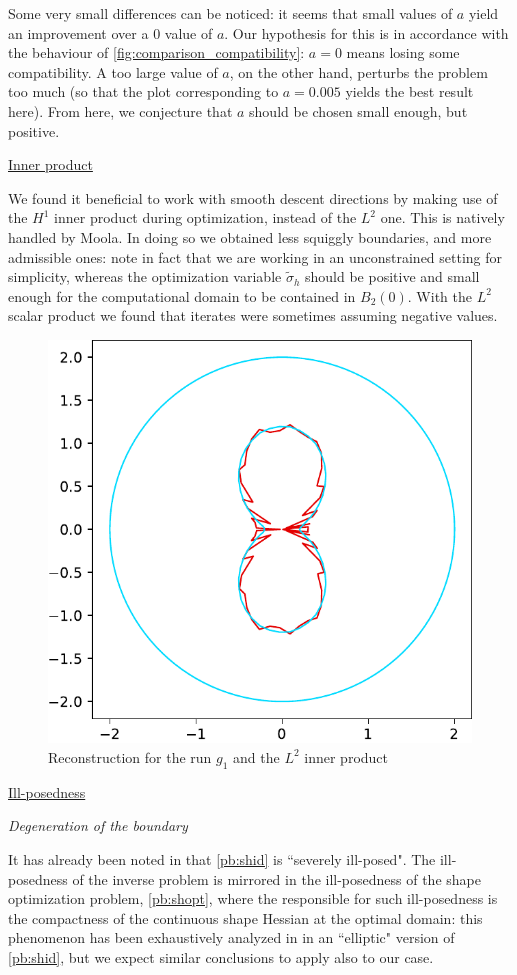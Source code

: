 \documentclass[english,a4paper,10pt,oneside]{scrbook}	%
\theoremstyle{break}
\theoremstyle{remark}
\begin{document}
Some very small differences can be noticed: it seems that small values of $a$ yield an improvement over a $0$ value of $a$. Our hypothesis for this is in accordance with the behaviour of \cref{fig:comparison_compatibility}: $a=0$ means losing some compatibility. A too large value of $a$, on the other hand, perturbs the problem too much (so that the plot corresponding to $a=0.005$ yields the best result here). From here, we conjecture that $a$ should be chosen small enough, but positive.


\underline{Inner product}

We found it beneficial to work with smooth descent directions by making use of the $H^1$ inner product during optimization, instead of the $L^2$ one. This is natively handled by Moola. In doing so we obtained less squiggly boundaries, and more admissible ones: note in fact that we are working in an unconstrained setting for simplicity, whereas the optimization variable $\tilde{\sigma}_h$ should be positive and small enough for the computational domain to be contained in $B_{2}(0)$. With the $L^2$ scalar product we found that iterates were sometimes assuming negative values.

\begin{figure}[H]
\centering
\includegraphics[height=0.3\columnwidth]{Images/hourglass_constant_l2/comparison.pdf}
\caption{Reconstruction for the run $g_1$ and the $L^2$ inner product}\label{fig:l2}
\end{figure}


\underline{Ill-posedness}

\textit{Degeneration of the boundary}

It has already been noted in \cite{harbrecht} that \cref{pb:shid} is ``severely ill-posed". The ill-posedness of the inverse problem is mirrored in the ill-posedness of the shape optimization problem, \cref{pb:shopt}, where the responsible for such ill-posedness is the compactness of the continuous shape Hessian at the optimal domain: this phenomenon has been exhaustively analyzed in \cite{eppler} in an ``elliptic" version of \cref{pb:shid}, but we expect similar conclusions to apply also to our case.
\end{document}
